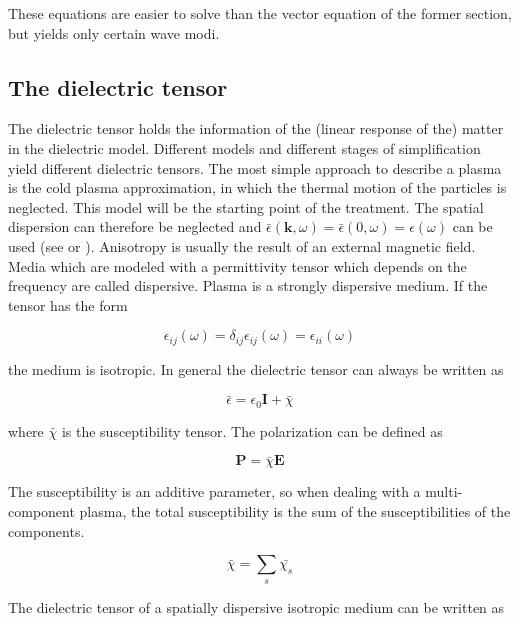 \documentclass[a4paper,11pt]{thesis}
\begin{document}
These equations are easier to solve than the vector equation of the former section, but yields only certain wave modi.

\subsection{The dielectric tensor}
The dielectric tensor holds the information of the (linear response of the) matter in the dielectric model. Different models and different stages of simplification yield different dielectric tensors. The most simple approach to describe a plasma is the cold plasma approximation, in which the thermal motion of the particles is neglected. This model will be the starting point of the treatment. The spatial dispersion can therefore be neglected and $\bar{\epsilon}(\mathbf{k},\omega)=\bar{\epsilon}(0,\omega)=\epsilon(\omega)$ can be used (see \cite{ginzburg} or \cite{stix}). Anisotropy is usually the result of an external magnetic field.\\

Media which are modeled with a permittivity tensor which depends on the frequency are called dispersive. Plasma is a strongly dispersive medium. If the tensor has the form

\begin{equation}
    \epsilon_{ij}(\omega)=\delta_{ij} \epsilon_{ij}(\omega)=\epsilon_{ii}(\omega)
\end{equation}

the medium is isotropic. In general the dielectric tensor can always be written as

\begin{equation}
    \bar{\epsilon}=\epsilon_0\mathbf{I}+\bar{\chi}
\end{equation}

where $\bar{\chi}$ is the susceptibility tensor. The polarization can be defined as

\begin{equation}
    \mathbf{P}=\bar{\chi} \mathbf{E}
\end{equation}

The susceptibility is an additive parameter, so when dealing with a multi-component plasma, the total susceptibility is the sum of the susceptibilities of the components.

\begin{equation}
    \bar{\chi}=\sum_s \bar{\chi_s}
\end{equation}


The dielectric tensor of a spatially dispersive isotropic medium can be written as
\end{document}
